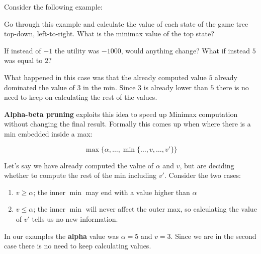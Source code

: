 \documentclass[11pt]{article}
\begin{document}
Consider the following example:

\vspace{1cm}




  \begin{exercise}
    Go through this example and calculate the value of each state of the game tree top-down, left-to-right.
    What is the minimax value of the top state?
  \end{exercise}
\censor{}

  \begin{exercise}
    If instead of $-1$ the utility was $-1000$, would anything change? What if instead $5$ was equal to $2$?
  \end{exercise}
\censor{}

What happened in this case was that the already computed value $5$ already dominated the value of $3$ in the min. Since $3$ is already lower than $5$ there is no need to keep on calculating the rest of the values. 

\textbf{Alpha-beta pruning} exploits this idea to speed up Minimax computation without changing the final result. Formally this comes up when where there is a min embedded inside a max:

\[ \max\{ \alpha, \ldots,  \min\{\ldots, v, \ldots, v' \} \}\]
  
\noindent Let's say we have already computed the value of $\alpha$ and $v$, but are deciding whether to compute the rest of the min including $v'$. Consider the two cases:

\begin{enumerate}
\item  $v \geq \alpha$; the inner $\min$ may end with a value higher than $\alpha$ 
\item  $v \leq \alpha$; the inner $\min$ will never affect the outer max, so calculating the value of $v'$ tells us no new information. 
\end{enumerate}

In our examples the \textbf{alpha} value was $\alpha = 5$ and $v=3$. Since we are in the second case there is no need to keep calculating values.
\end{document}
